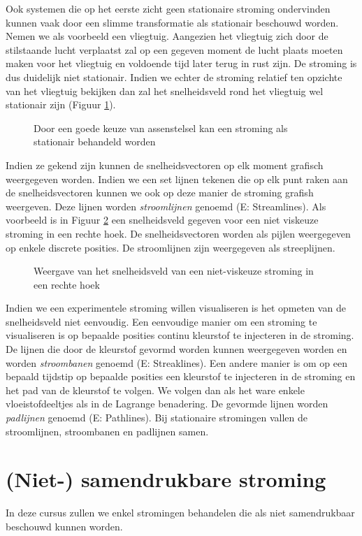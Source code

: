 \npar
Ook systemen die op het eerste zicht geen stationaire stroming ondervinden kunnen vaak door een slimme transformatie als stationair beschouwd worden. Nemen we als voorbeeld een vliegtuig. Aangezien het vliegtuig zich door de stilstaande lucht verplaatst zal op een gegeven moment de lucht plaats moeten maken voor het vliegtuig en voldoende tijd later terug in rust zijn. De stroming is dus duidelijk niet stationair. Indien we echter de stroming relatief ten opzichte van het vliegtuig bekijken dan zal het snelheidsveld rond het vliegtuig wel stationair zijn (Figuur \ref{fig:stationaire stroming vliegtuig}). 
\begin{figure}[htb]
	\centering
	
	\caption{Door een goede keuze van assenstelsel kan een stroming als stationair behandeld worden}
	\label{fig:stationaire stroming vliegtuig}
\end{figure}
\npar
Indien ze gekend zijn kunnen de snelheidsvectoren op elk moment grafisch weergegeven worden. Indien we een set lijnen tekenen die op elk punt raken aan de snelheidsvectoren kunnen we ook op deze manier de stroming grafish weergeven. Deze lijnen worden \emph{stroomlijnen} genoemd (E: Streamlines). Als voorbeeld is in Figuur \ref{fig:snelheidsveld} een snelheidsveld gegeven voor een niet viskeuze stroming in een rechte hoek. De snelheidsvectoren worden als pijlen weergegeven op enkele discrete posities. De stroomlijnen zijn weergegeven als streeplijnen.
\begin{figure}[htb]
	\centering
	
	\caption{Weergave van het snelheidsveld van een niet-viskeuze stroming in een rechte hoek}
	\label{fig:snelheidsveld}
\end{figure}
Indien we een experimentele stroming willen visualiseren is het opmeten van de snelheidsveld niet eenvoudig. Een eenvoudige manier om een stroming te visualiseren is op bepaalde posities continu kleurstof te injecteren in de stroming. De lijnen die door de kleurstof gevormd worden kunnen weergegeven worden en worden \emph{stroombanen} genoemd (E: Streaklines).
Een andere manier is om op een bepaald tijdstip op bepaalde posities een kleurstof te injecteren in de stroming en het pad van de kleurstof te volgen. We volgen dan als het ware enkele vloeistofdeeltjes als in de Lagrange benadering. De gevormde lijnen worden \emph{padlijnen} genoemd (E: Pathlines).
Bij stationaire stromingen vallen de stroomlijnen, stroombanen en padlijnen samen.

	\FloatBarrier
	\section{(Niet-) samendrukbare stroming}
In deze cursus zullen we enkel stromingen behandelen die als niet samendrukbaar beschouwd kunnen worden.